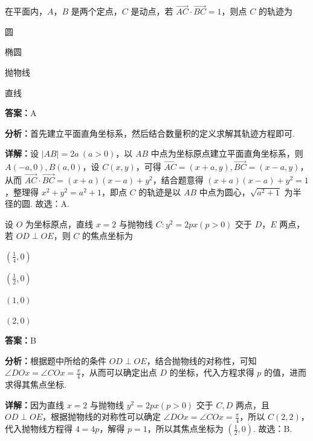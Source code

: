 \begin{question}[points=5]
在平面内，$A$，$B$ 是两个定点，$C$ 是动点，若 $\overrightarrow{AC}\cdot\overrightarrow{BC}=1$，则点 $C$ 的轨迹为
\begin{choices}
  \item 圆
  \item 椭圆
  \item 抛物线
  \item 直线
\end{choices}
\begin{solution}
\textbf{答案：}A

\textbf{分析：}首先建立平面直角坐标系，然后结合数量积的定义求解其轨迹方程即可.

\textbf{详解：}设 $|AB|=2a\ (a>0)$，以 $AB$ 中点为坐标原点建立平面直角坐标系，则 $A(-a,0),B(a,0)$，设 $C(x,y)$，可得 $\overrightarrow{AC}=(x+a,y),\overrightarrow{BC}=(x-a,y)$，从而 $\overrightarrow{AC}\cdot\overrightarrow{BC}=(x+a)(x-a)+y^2$，结合题意得 $(x+a)(x-a)+y^2=1$，整理得 $x^2+y^2=a^2+1$，即点 $C$ 的轨迹是以 $AB$ 中点为圆心，$\sqrt{a^2+1}$ 为半径的圆. 故选：A.
\end{solution}
\end{question}

\begin{question}[points=5]
设 $O$ 为坐标原点，直线 $x=2$ 与抛物线 $C:y^2=2px(p>0)$ 交于 $D$，$E$ 两点，若 $OD\perp OE$，则 $C$ 的焦点坐标为
\begin{choices}
  \item $(\frac{1}{4},0)$
  \item $(\frac{1}{2},0)$
  \item $(1,0)$
  \item $(2,0)$
\end{choices}
\begin{solution}
\textbf{答案：}B

\textbf{分析：}根据题中所给的条件 $OD\perp OE$，结合抛物线的对称性，可知 $\angle DOx=\angle COx=\frac{\pi}{4}$，从而可以确定出点 $D$ 的坐标，代入方程求得 $p$ 的值，进而求得其焦点坐标.

\textbf{详解：}因为直线 $x=2$ 与抛物线 $y^2=2px(p>0)$ 交于 $C,D$ 两点，且 $OD\perp OE$，根据抛物线的对称性可以确定 $\angle DOx=\angle COx=\frac{\pi}{4}$，所以 $C(2,2)$，代入抛物线方程得 $4=4p$，解得 $p=1$，所以其焦点坐标为 $(\frac{1}{2},0)$. 故选：B.
\end{solution}
\end{question}

